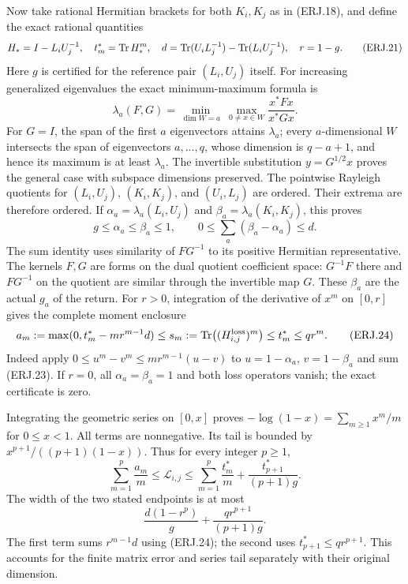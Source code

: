 Now take rational Hermitian brackets for both $K_i,K_j$ as in
(ERJ.18), and define the exact rational quantities
\[
 H_*=I-L_iU_j^{-1},\quad t_m^*=\operatorname{Tr} H_*^m,\quad
 d=\operatorname{Tr}(U_iL_j^{-1})-\operatorname{Tr}(L_iU_j^{-1}),\quad r=1-g.
 \tag{ERJ.21}
\]
Here $g$ is certified for the reference pair $(L_i,U_j)$ itself.
For increasing generalized eigenvalues the exact minimum-maximum
formula is
\[
 \lambda_a(F,G)=\min_{\dim W=a}\ \max_{0\ne x\in W}
                 \frac{x^*Fx}{x^*Gx}.\tag{ERJ.22}
\]
For $G=I$, the span of the first $a$ eigenvectors attains
$\lambda_a$; every $a$-dimensional $W$ intersects the span of
eigenvectors $a,\ldots,q$, whose dimension is $q-a+1$, and hence
its maximum is at least $\lambda_a$. The invertible substitution
$y=G^{1/2}x$ proves the general case with subspace dimensions preserved.
The pointwise Rayleigh quotients for $(L_i,U_j)$, $(K_i,K_j)$,
and $(U_i,L_j)$ are ordered. Their extrema are therefore ordered.
If $\alpha_a=\lambda_a(L_i,U_j)$ and
$\beta_a=\lambda_a(K_i,K_j)$, this proves
\[
 g\le\alpha_a\le\beta_a\le1,
 \qquad0\le\sum_a(\beta_a-\alpha_a)\le d.\tag{ERJ.23}
\]
The sum identity uses similarity of $FG^{-1}$ to its positive
Hermitian representative. The kernels $F,G$ are forms on the dual
quotient coefficient space: $G^{-1}F$ there and $FG^{-1}$ on the
quotient are similar through the invertible map $G$.
These $\beta_a$ are the actual $g_a$
of the return. For $r>0$, integration of the derivative of $x^m$
on $[0,r]$ gives the complete moment enclosure
\[
 a_m:=\max(0,t_m^*-mr^{m-1}d)
 \le s_m:=\operatorname{Tr}\bigl((H_{i,j}^{\rm loss})^m\bigr)
 \le t_m^*\le qr^m.\tag{ERJ.24}
\]
Indeed apply $0\le u^m-v^m\le mr^{m-1}(u-v)$ to
$u=1-\alpha_a$, $v=1-\beta_a$ and sum (ERJ.23).
If $r=0$, all $\alpha_a=\beta_a=1$ and both loss operators vanish;
the exact certificate is zero.

Integrating the geometric series on $[0,x]$ proves
$-\log(1-x)=\sum_{m\ge1}x^m/m$ for $0\le x<1$.
All terms are nonnegative. Its tail is bounded by
$x^{p+1}/((p+1)(1-x))$. Thus for every integer $p\ge1$,
\[
 \boxed{\sum_{m=1}^p\frac{a_m}{m}\le\mathcal L_{i,j}\le
 \sum_{m=1}^p\frac{t_m^*}{m}+
                   \frac{t_{p+1}^*}{(p+1)g}.}\tag{ERJ.25}
\]
The width of the two stated endpoints is at most
\[
 \frac{d(1-r^p)}{g}+\frac{qr^{p+1}}{(p+1)g}.\tag{ERJ.26}
\]
The first term sums $r^{m-1}d$ using (ERJ.24); the second uses
$t_{p+1}^*\le qr^{p+1}$. This accounts for the finite matrix
error and series tail separately with their original dimension.

